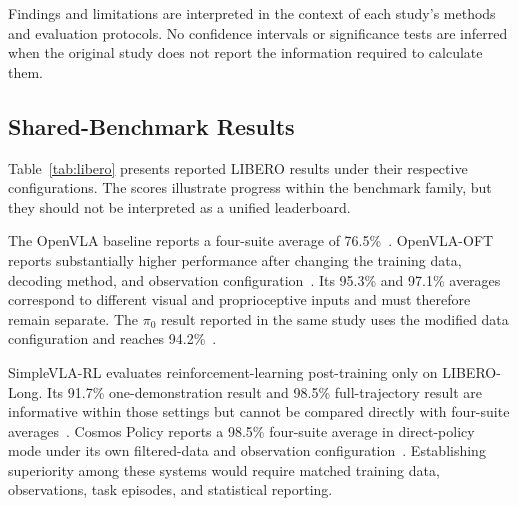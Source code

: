 \documentclass{ieeeaccess}
\begin{document}
\textcolor[RGB]{104,48,148}{Findings and limitations are interpreted in the context of each study's methods and evaluation protocols.} No confidence intervals or significance tests are inferred when the original study does not report the information required to calculate them.

\subsection{Shared-Benchmark Results}

Table~\ref{tab:libero} presents reported LIBERO results under their respective configurations. The scores illustrate progress within the benchmark family, but they should not be interpreted as a unified leaderboard.

The OpenVLA baseline reports a four-suite average of 76.5\%~\cite{openvla}. OpenVLA-OFT reports substantially higher performance after changing the training data, decoding method, and observation configuration~\cite{openvlaoft}. Its 95.3\% and 97.1\% averages correspond to different visual and proprioceptive inputs and must therefore remain separate. The $\pi_0$ result reported in the same study uses the modified data configuration and reaches 94.2\%~\cite{openvlaoft}.

SimpleVLA-RL evaluates reinforcement-learning post-training only on LIBERO-Long. Its 91.7\% one-demonstration result and 98.5\% full-trajectory result are informative within those settings but cannot be compared directly with four-suite averages~\cite{simplevlarl}. Cosmos Policy reports a 98.5\% four-suite average in direct-policy mode under its own filtered-data and observation configuration~\cite{cosmospolicy}. Establishing superiority among these systems would require matched training data, observations, task episodes, and statistical reporting.
\end{document}
